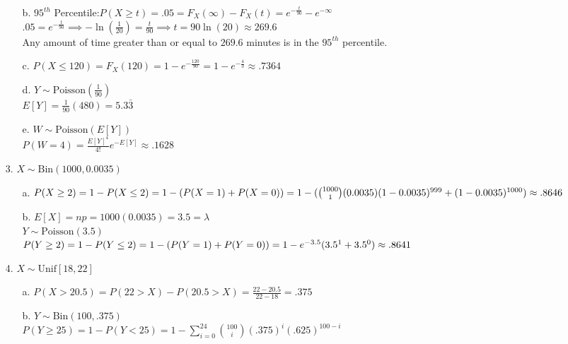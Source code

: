 \documentclass[11pt]{amsart}
\theoremstyle{definition}
\begin{document}
\begin{itemize}
\begin{itemize}
    \item[b.] $95^{th}$ Percentile:$P(X\ge t)=.05=F_X(\infty)-F_X(t)=e^{-\frac t{90}}-e^{-\infty}$\\
              $.05=e^{-\frac t{90}}\implies -\ln(\frac{1}{20})=\frac t{90}\implies t=90\ln(20)\approx269.6$ \\
              Any amount of time greater than or equal to $269.6$ minutes is in the $95^{th}$ percentile.

    \item[c.] $P(X\le 120)=F_X(120)=1-e^{-\frac{120}{90}}=1-e^{-\frac 43}\approx .7364$

    \item[d.] $Y\sim\text{Poisson}(\frac{1}{90})$ \\
              $E[Y]=\frac1{90}(480)=5.3\bar 3$

    \item[e.] $W\sim\text{Poisson}(E[Y])$ \\
              $P(W=4)=\frac{E[Y]^4}{4!}e^{-E[Y]}\approx .1628$

\end{itemize}

\item[3.] $X\sim\text{Bin}(1000, 0.0035)$
\begin{itemize}
    \item[a.] $P(X\ge 2)=1-P(X\le 2)=1-(P(X=1)+P(X=0))\\
              =1-(\binom{1000}1(0.0035)(1-0.0035)^{999}+(1-0.0035)^{1000})\approx .8646$

    \item[b.] $E[X]=np=1000(0.0035)=3.5=\lambda$ \\
              $Y\sim\text{Poisson}(3.5)$ \\
              $P(Y\ge 2)=1-P(Y\le 2)=1-(P(Y=1)+P(Y=0))\\
              =1-e^{-3.5}(3.5^1+3.5^0)\approx .8641$
    
\end{itemize}

\item[4.] $X\sim\text{Unif}[18,22]$
\begin{itemize}
    \item[a.] $P(X>20.5)=P(22>X)-P(20.5>X)=\frac{22-20.5}{22-18}=.375$

    \item[b.] $Y\sim\text{Bin}(100,.375)$ \\
              $\displaystyle P(Y\ge 25)=1-P(Y<25)=1-\sum_{i=0}^{24}\binom{100}{i}(.375)^i(.625)^{100-i}$
    

\end{itemize}
\end{itemize}
\end{document}
